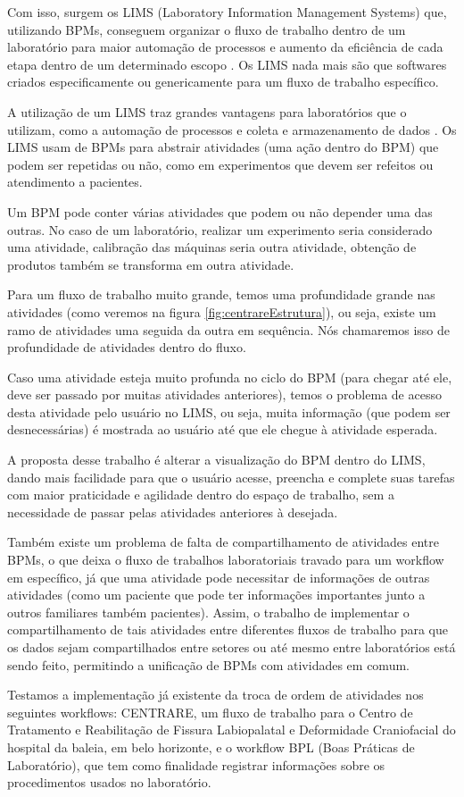 Com isso, surgem os LIMS (Laboratory Information Management Systems) que, utilizando BPMs, conseguem organizar o fluxo de trabalho dentro de um laboratório para maior automação de processos e aumento da eficiência de cada etapa dentro de um determinado escopo \cite{Key2011}. Os LIMS nada mais são que softwares criados especificamente ou genericamente para um fluxo de trabalho específico.

A utilização de um LIMS traz grandes vantagens para laboratórios que o utilizam, como a automação de processos e coleta e armazenamento de dados \cite{Key2011}. Os LIMS usam de BPMs para abstrair atividades (uma ação dentro do BPM) que podem ser repetidas ou não, como em experimentos que devem ser refeitos ou atendimento a pacientes. 

Um BPM pode conter várias atividades que podem ou não depender uma das outras. No caso de um laboratório, realizar um experimento seria considerado uma atividade, calibração das máquinas seria outra atividade, obtenção de produtos também se transforma em outra atividade.

Para um fluxo de trabalho muito grande, temos uma profundidade grande nas atividades (como veremos na figura \ref{fig:centrareEstrutura}), ou seja, existe um ramo de atividades uma seguida da outra em sequência. Nós chamaremos isso de profundidade de atividades dentro do fluxo.

Caso uma atividade esteja muito profunda no ciclo do BPM (para chegar até ele, deve ser passado por muitas atividades anteriores), temos o problema de acesso desta atividade pelo usuário no LIMS, ou seja, muita informação (que podem ser desnecessárias) é mostrada ao usuário até que ele chegue à atividade esperada.

A proposta desse trabalho é alterar a visualização do BPM dentro do LIMS, dando mais facilidade para que o usuário acesse, preencha e complete suas tarefas com maior praticidade e agilidade dentro do espaço de trabalho, sem a necessidade de passar pelas atividades anteriores à desejada.

Também existe um problema de falta de compartilhamento de atividades entre BPMs, o que deixa o fluxo de trabalhos laboratoriais travado para um workflow em específico, já que uma atividade pode necessitar de informações de outras atividades (como um paciente que pode ter informações importantes junto a outros familiares também pacientes). Assim, o trabalho de implementar o compartilhamento de tais atividades entre diferentes fluxos de trabalho para que os dados sejam compartilhados entre setores ou até mesmo entre laboratórios está sendo feito, permitindo a unificação de BPMs com atividades em comum.

Testamos a implementação já existente da troca de ordem de atividades nos seguintes workflows: CENTRARE, um fluxo de trabalho para o Centro de Tratamento e Reabilitação de Fissura Labiopalatal e Deformidade Craniofacial do hospital da baleia, em belo horizonte, e o workflow BPL (Boas Práticas de Laboratório), que tem como finalidade registrar informações sobre os procedimentos usados no laboratório.